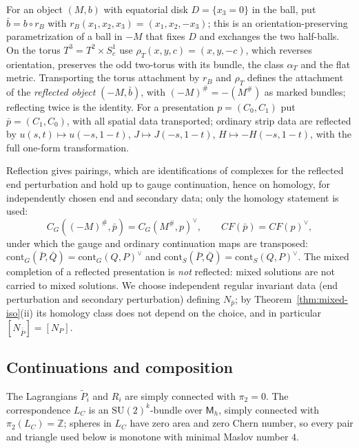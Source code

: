 \documentclass[11pt]{amsart}
\theoremstyle{definition}
\theoremstyle{remark}
\theoremstyle{plain}
\numberwithin{equation}{section}
\newcommand{\ZZ}{\mathbb{Z}}
\newcommand{\SU}{\mathrm{SU}}
\newcommand{\CF}{\mathit{CF}}
\newcommand{\Msf}{\mathsf{M}}
\begin{document}
For an object $(M,b)$ with equatorial disk $D=\{x_3=0\}$ in the ball, put
$\bar b=b\circ r_B$ with $r_B(x_1,x_2,x_3)=(x_1,x_2,-x_3)$; this is an
orientation-preserving parametrization of a ball in $-M$ that fixes $D$ and
exchanges the two half-balls. On the torus $T^3=T^2\times S^1_c$ use
$\rho_T(x,y,c)=(x,y,-c)$, which reverses orientation, preserves the odd two-torus
with its bundle, the class $\alpha_T$ and the flat metric. Transporting the torus
attachment by $r_B$ and $\rho_T$ defines the attachment of the \emph{reflected
object} $(-M,\bar b)$, with $(-M)^\#=-(M^\#)$ as marked bundles; reflecting twice
is the identity. For a presentation $p=(C_0,C_1)$ put $\bar p=(C_1,C_0)$, with all
spatial data transported; ordinary strip data are reflected by
$u(s,t)\mapsto u(-s,1-t)$, $J\mapsto J(-s,1-t)$, $H\mapsto-H(-s,1-t)$, with the
full one-form transformation.

Reflection gives pairings, which are identifications of complexes for the reflected
end perturbation and hold up to gauge continuation, hence on homology, for
independently chosen end and secondary data; only the homology statement is used:
\[
C_G((-M)^\#,\bar p)=C_G(M^\#,p)^\vee,\qquad
\CF(\bar p)=\CF(p)^\vee,
\]
under which the gauge and ordinary continuation maps are transposed:
$\mathrm{cont}_G(\bar P,\bar Q)=\mathrm{cont}_G(Q,P)^\vee$ and $\mathrm{cont}_S(\bar P,\bar Q)=\mathrm{cont}_S(Q,P)^\vee$. The mixed
completion of a reflected presentation is \emph{not} reflected: mixed solutions
are not carried to mixed solutions. We choose independent regular invariant data (end perturbation and secondary perturbation) defining $N_{\bar p}$; by Theorem~\ref{thm:mixed-iso}(ii) its homology
class does not depend on the choice, and in particular
$[N_{\bar{\bar P}}]=[N_P]$.

\subsection{Continuations and composition}\label{subsec:continuations}

The Lagrangians $\widetilde P_i$ and $R_i$ are simply connected with $\pi_2=0$.
The correspondence $L_C$ is an $\SU(2)^k$-bundle over $\Msf_h$, simply connected
with $\pi_2(L_C)=\ZZ$; spheres in $L_C$ have zero area and zero Chern number, so
every pair and triangle used below is monotone with minimal Maslov number $4$.
\end{document}
